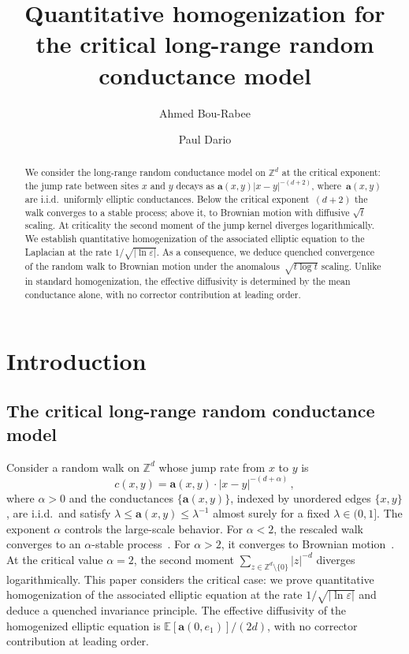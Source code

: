 \documentclass[11pt]{amsart}
\title[Homogenization for the critical long-range random conductance model]{Quantitative homogenization for the critical long-range random conductance model}
\author{Ahmed Bou-Rabee}
\author{Paul Dario}
\theoremstyle{plain}
\theoremstyle{definition}
\theoremstyle{remark}
\newcommand{\E}{\mathbb{E}}
\newcommand{\Zd}{\mathbb{Z}^d}
\renewcommand{\a}{\mathbf{a}}
\newcommand{\eps}{\varepsilon}
\begin{document}
	
	\begin{abstract}
		We consider the long-range random conductance model on $\mathbb{Z}^d$ at the critical exponent: the jump rate between sites $x$ and $y$ decays as $\a(x,y) |x-y|^{-(d+2)}$, where~$\a(x,y)$ are i.i.d.\ uniformly elliptic conductances.
		Below the critical exponent~$(d+2)$ the walk converges to a stable process; above it, to Brownian motion with diffusive $\sqrt{t}$ scaling.
		At criticality the second moment of the jump kernel diverges logarithmically.
		We establish quantitative homogenization of the associated elliptic equation to the Laplacian at the rate $1/\sqrt{|\ln\varepsilon|}$.
		As a consequence, we deduce quenched convergence of the random walk to Brownian motion under the anomalous~$\sqrt{t \log t}$ scaling.
		Unlike in standard homogenization, the effective diffusivity is determined by the mean conductance alone, with no corrector contribution at leading order.
	\end{abstract}
	
	
	
	
	\maketitle
	
	\section{Introduction}
	
	\subsection{The critical long-range random conductance model}
	
	Consider a random walk on $\Zd$ whose jump rate from $x$ to $y$ is
	\begin{equation}
		\label{e.jump.rates}
		c(x,y) = \a(x,y) \cdot |x - y|^{-(d+\alpha)}\,,
	\end{equation}
	where $\alpha > 0$ and the conductances $\{\a(x,y)\}$, indexed by unordered edges $\{x,y\}$, are i.i.d.\ and satisfy $\lambda \le \a(x,y) \le \lambda^{-1}$ almost surely for a fixed $\lambda \in (0,1]$.
	The exponent $\alpha$ controls the large-scale behavior.
	For $\alpha < 2$, the rescaled walk converges to an $\alpha$-stable process~\cite{ChenKumagaiWang2021,ChenChenKumagaiWang2025}.
	For $\alpha > 2$, it converges to Brownian motion~\cite{BiskupChenKumagaiWang2021}.
	At the critical value $\alpha = 2$, the second moment $\sum_{z \in \Zd \setminus \{0\}} |z|^{-d}$ diverges logarithmically.
	This paper considers the critical case: we prove quantitative homogenization of the associated elliptic equation at the rate $1/\sqrt{|\ln\eps|}$ and deduce a quenched invariance principle.
	The effective diffusivity of the homogenized elliptic equation is $\E[\a(0,e_1)]/(2d)$, with no corrector contribution at leading order.
	
\end{document}
